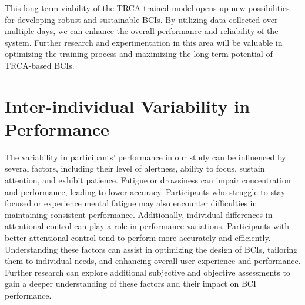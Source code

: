 This long-term viability of the TRCA trained model opens up new possibilities for developing robust and sustainable BCIs. By utilizing data collected over multiple days, we can enhance the overall performance and reliability of the system. Further research and experimentation in this area will be valuable in optimizing the training process and maximizing the long-term potential of TRCA-based BCIs.

\section{Inter-individual Variability in Performance}

The variability in participants' performance in our study can be influenced by several factors, including their level of alertness, ability to focus, sustain attention, and exhibit patience. Fatigue or drowsiness can impair concentration and performance, leading to lower accuracy. Participants who struggle to stay focused or experience mental fatigue may also encounter difficulties in maintaining consistent performance. Additionally, individual differences in attentional control can play a role in performance variations. Participants with better attentional control tend to perform more accurately and efficiently. Understanding these factors can assist in optimizing the design of BCIs, tailoring them to individual needs, and enhancing overall user experience and performance. Further research can explore additional subjective and objective assessments to gain a deeper understanding of these factors and their impact on BCI performance.

